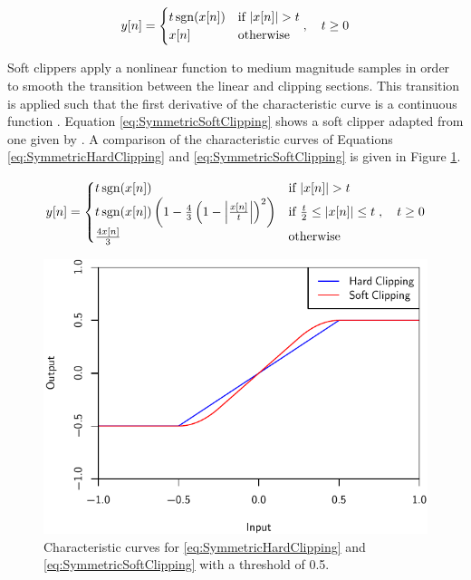 		\begin{equation}
			y[n] = \begin{cases}
				t\operatorname{sgn}(x[n]) & \text{if $\left|x[n]\right| > t$} \\
				x[n] & \text{otherwise}
			\end{cases}, \quad t \geq 0
			\label{eq:SymmetricHardClipping}
		\end{equation}
		
		Soft clippers apply a nonlinear function to medium magnitude samples in order to smooth the transition
		between the linear and clipping sections. This transition is applied such that the first derivative of the
		characteristic curve is a continuous function \citep{esqueda2015aliasing}. Equation
		\ref{eq:SymmetricSoftClipping} shows a soft clipper adapted from one given by
		\citet{dutilleux2011nonlinear}. A comparison of the characteristic curves of Equations
		\ref{eq:SymmetricHardClipping} and \ref{eq:SymmetricSoftClipping} is given in Figure \ref{fig:Clipping}.

		\begin{equation}
			y[n] = \begin{cases}
				t\operatorname{sgn}(x[n]) & \text{if $\left|x[n]\right| > t$} \\
				t\operatorname{sgn}(x[n]) \left( 1 - \frac{4}{3} \left( 1 - \left|\frac{x[n]}{t}\right| \right)^{2}
				           \right) & \text{if $\frac{t}{2} \leq \left|x[n]\right| \leq t$} \\
				\frac{4x[n]}{3} & \text{otherwise}
			\end{cases}, \quad t \geq 0
			\label{eq:SymmetricSoftClipping}
		\end{equation}

		\begin{figure}[h!]
			\centering
			\includegraphics{chapter3/Images/Clipping.pdf}
			\caption{Characteristic curves for \ref{eq:SymmetricHardClipping} and
				 \ref{eq:SymmetricSoftClipping} with a threshold of 0.5.}
			\label{fig:Clipping}
		\end{figure}

